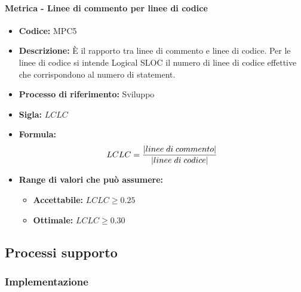     \paragraph{Metrica - Linee di commento per linee di codice}
    \begin{itemize}
        \item \textbf{Codice:} MPC5
        \item \textbf{Descrizione:} È il rapporto tra linee di commento e linee di codice. Per le linee di codice si intende Logical SLOC il numero di linee di codice effettive che corrispondono al numero di statement.
        \item \textbf{Processo di riferimento:} Sviluppo
        \item \textbf{Sigla:} $LCLC$
        \item \textbf{Formula:}$$LCLC = {|linee \; di \; commento| \over |linee \; di \; codice|}$$
        \item \textbf{Range di valori che può assumere:}
        \begin{itemize}
            \item \textbf{Accettabile:} $LCLC \geq 0.25$
            \item \textbf{Ottimale:} $LCLC \geq 0.30$
        \end{itemize}
    \end{itemize}

\subsection{Processi supporto}

\subsubsection{Implementazione}
